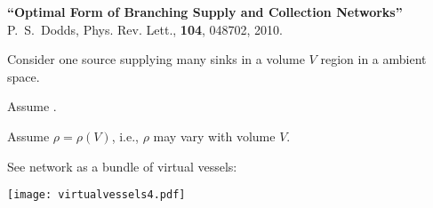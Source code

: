 
  \textbf{
      ``Optimal Form of Branching Supply and Collection Networks''\cite{dodds2010a}
    }
    P.\ S.\ Dodds, Phys. Rev. Lett., \textbf{104}, 048702, 2010.
    
     
      Consider \alert{one source} supplying \alert{many sinks} in a 
      volume $V$  region
      in a  ambient space.
    
      Assume .
    
      Assume \alert{$\rho = \rho(V)$}, i.e., $\rho$ may vary with volume $V$.
     
      See network as a bundle of virtual vessels:
      \begin{center}
                  
          
          \texttt{[image: virtualvessels4.pdf]}
              \end{center}
     
